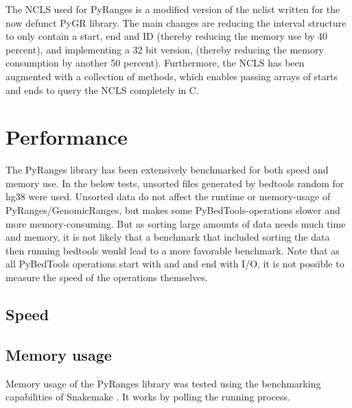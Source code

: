 \documentclass[10pt,letterpaper]{article}
\begin{document}
The NCLS used for PyRanges is a modified version of the nclist written for the
now defunct PyGR library. The main changes are reducing the interval structure
to only contain a start, end and ID (thereby reducing the memory use by 40
percent), and implementing a 32 bit version, (thereby reducing the memory
consumption by another 50 percent). Furthermore, the NCLS has been augmented
with a collection of methods, which enables passing arrays of starts and ends to
query the NCLS completely in C.

\section*{Performance}

The PyRanges library has been extensively benchmarked for both speed and memory
use. In the below tests, unsorted files generated by bedtools random for hg38
were used. Unsorted data do not affect the runtime or memory-usage of
PyRanges/GenomicRanges, but makes some PyBedTools-operations slower and more
memory-consuming. But as sorting large amounts of data needs much time and
memory, it is not likely that a benchmark that included sorting the data then
running bedtools would lead to a more favorable benchmark. Note that as all
PyBedTools operations start with and and end with I/O, it is not possible
to measure the speed of the operations themselves.

\subsection*{Speed}



\subsection*{Memory usage}

Memory usage of the PyRanges library was tested using the benchmarking
capabilities of Snakemake \cite{doi:10.1093/bioinformatics/bty350}. It works by
polling the running process.
\end{document}
